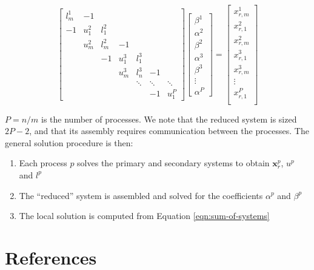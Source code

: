 \documentclass{elsarticle}
\begin{document}
\begin{equation} \label{eqn:reduced-system}
\begin{bmatrix}
l^1_m & -1 \\
-1    & u^2_1 & l^2_1 \\
      & u^2_m & l^2_m & -1 \\
      &       & -1    & u^3_1 & l^3_1 \\
      &       &       & u^3_m & l^3_n  & -1 \\
      &       &       &       & \ddots & \ddots & \ddots \\
      &       &       &       &        & -1     & u^P_1
\end{bmatrix}
\begin{bmatrix}
\beta^1 \\
\alpha^2 \\
\beta^2 \\
\alpha^3 \\
\beta^3 \\
\vdots \\
\alpha^P
\end{bmatrix}
=
\begin{bmatrix}
x_{r,m}^1 \\
x_{r,1}^2 \\
x_{r,m}^2 \\
x_{r,1}^3 \\
x_{r,m}^3 \\
\vdots \\
x_{r,1}^P \\
\end{bmatrix}
\end{equation}

$P = n/m$ is the number of processes.
We note that the reduced system is sized $2P-2$,
and that its assembly requires communication between the processes.
The general solution procedure is then:

\begin{enumerate}
    \item Each process $p$ solves the primary and secondary systems
        to obtain $\boldsymbol{x}_r^p$, $u^p$ and $l^p$
    \item The ``reduced'' system is assembled and solved for
        the coefficients $\alpha^p$ and $\beta^p$
    \item The local solution is computed from Equation \ref{eqn:sum-of-systems}
\end{enumerate}


\section*{References}



\end{document}
